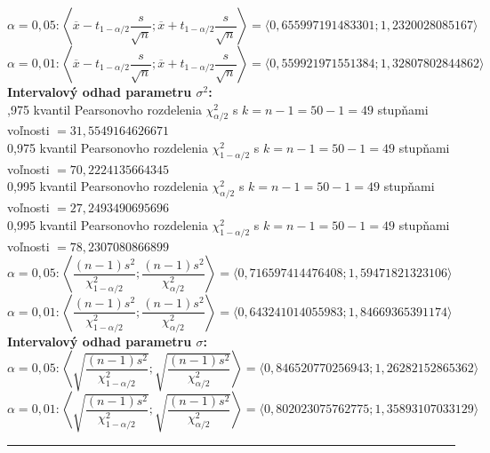 \documentclass[pdftex, 11pt, a4paper, titlepage]{article}
\begin{document}
    \noindent
    $\alpha=0,05:\left\langle \overline{x}-t_{1-\alpha/2}\dfrac{s}{\sqrt{n}} ; \overline{x}+t_{1-\alpha/2}\dfrac{s}{\sqrt{n}} \right\rangle = \langle 0,655997191483301 ; 1,2320028085167 \rangle$\\
    $\alpha=0,01:\left\langle \overline{x}-t_{1-\alpha/2}\dfrac{s}{\sqrt{n}} ; \overline{x}+t_{1-\alpha/2}\dfrac{s}{\sqrt{n}} \right\rangle = \langle 0,559921971551384 ; 1,32807802844862 \rangle$\\


    \noindent
    \textbf{Intervalový odhad parametru $\sigma^2$:}\\
    ,975 kvantil Pearsonovho rozdelenia $\chi_{\alpha/2}^{2}$ s $k = n-1 = 50-1=49$
    stupňami voľnosti $=31,5549164626671$\\
    0,975 kvantil Pearsonovho rozdelenia $\chi_{1-\alpha/2}^{2}$ s $k = n-1 = 50-1=49$
    stupňami voľnosti $=70,2224135664345$\\
    0,995 kvantil Pearsonovho rozdelenia $\chi_{\alpha/2}^{2}$ s $k = n-1 = 50-1=49$
    stupňami voľnosti $=27,2493490695696$\\
    0,995 kvantil Pearsonovho rozdelenia $\chi_{1-\alpha/2}^{2}$ s $k = n-1 = 50-1=49$
    stupňami voľnosti $=78,2307080866899$\\

    \noindent
    $\alpha=0,05: \left\langle \dfrac{(n-1)s^2}{\chi_{1-\alpha/2}^2} ; \dfrac{(n-1)s^2}{\chi_{\alpha/2}^2} \right\rangle = \langle 0,716597414476408 ; 1,59471821323106 \rangle$\\
    $\alpha=0,01: \left\langle \dfrac{(n-1)s^2}{\chi_{1-\alpha/2}^2} ; \dfrac{(n-1)s^2}{\chi_{\alpha/2}^2} \right\rangle = \langle 0,643241014055983 ; 1,84669365391174 \rangle$\\

    \noindent
    \textbf{Intervalový odhad parametru $\sigma$:}\\

    \noindent
    $\alpha=0,05: \left\langle \sqrt{\dfrac{(n-1)s^2}{\chi_{1-\alpha/2}^2}} ; \sqrt{\dfrac{(n-1)s^2}{\chi_{\alpha/2}^2}} \right\rangle = \langle 0,846520770256943 ; 1,26282152865362 \rangle$\\
    $\alpha=0,01: \left\langle \sqrt{\dfrac{(n-1)s^2}{\chi_{1-\alpha/2}^2}} ; \sqrt{\dfrac{(n-1)s^2}{\chi_{\alpha/2}^2}} \right\rangle = \langle 0,802023075762775 ; 1,35893107033129 \rangle$\\

    \noindent\rule{\linewidth}{0.4pt}\\
\end{document}
